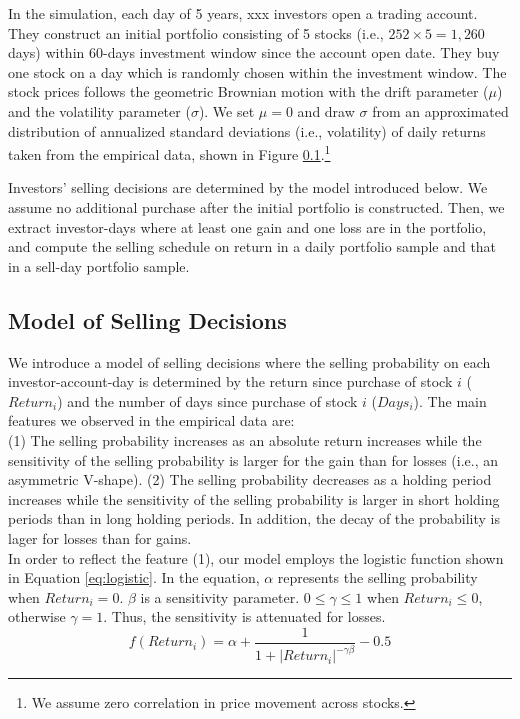 \documentclass[11pt, a4paper]{article}
\begin{document}
In the simulation, each day of 5 years, xxx investors open a trading account. They construct an initial portfolio consisting of 5 stocks (i.e., $252\times5=1,260$ days) within 60-days investment window since the account open date. They buy one stock on a day which is randomly chosen within the investment window. The stock prices follows the geometric Brownian motion with the drift parameter ($\mu$) and the volatility parameter ($\sigma$). We set $\mu=0$ and draw $\sigma$ from an approximated distribution of annualized standard deviations (i.e., volatility) of daily returns taken from the empirical data, shown in Figure \ref{}.\footnote{We assume zero correlation in price movement across stocks.}

Investors' selling decisions are determined by the model introduced below. We assume no additional purchase after the initial portfolio is constructed. Then, we extract investor-days where at least one gain and one loss are in the portfolio, and compute the selling schedule on return in a daily portfolio sample and that in a sell-day portfolio sample.

\subsection{Model of Selling Decisions}
We introduce a model of selling decisions where the selling probability on each investor-account-day is determined by the return since purchase of stock $i$ ($Return_i$) and the number of days since purchase of stock $i$ ($Days_i$). 
The main features we observed in the empirical data are:\\
(1) The selling probability increases as an absolute return increases while the sensitivity of the selling probability is larger for the gain than for losses (i.e., an asymmetric V-shape).
(2) The selling probability decreases as a holding period increases while the sensitivity of the selling probability is larger in short holding periods than in long holding periods. In addition, the decay of the probability is lager for losses than for gains.\\

In order to reflect the feature (1), our model employs the logistic function shown in Equation \ref{eq:logistic}.
In the equation, $\alpha$ represents the selling probability when $Return_i=0$. $\beta$ is a sensitivity parameter. $0\leq \gamma \leq 1$ when $Return_i\leq 0$, otherwise $\gamma=1$. Thus, the sensitivity is attenuated for losses.
\begin{equation}
\label{eq:logistic}
f(Return_i) = \alpha + \frac{1}{1+|Return_i|^{-\gamma \beta}}-0.5
\end{equation}
\end{document}
